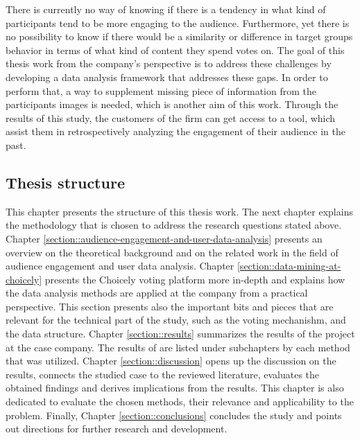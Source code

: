     There is currently no way of knowing if there is a tendency in what kind of participants tend to be more engaging to the audience. Furthermore, yet there is no possibility to know if there would be a similarity or difference in target groups behavior in terms of what kind of content they spend votes on. The goal of this thesis work from the company's perspective is to address these challenges by developing a data analysis framework that addresses these gaps. In order to perform that, a way to supplement missing piece of information from the participants images is needed, which is another aim of this work. Through the results of this study, the customers of the firm can get access to a tool, which assist them in retrospectively analyzing the engagement of their audience in the past.

\subsection{Thesis structure}
    This chapter presents the structure of this thesis work. The next chapter explains the methodology that is chosen to address the research questions stated above. Chapter \ref{section::audience-engagement-and-user-data-analysis} presents an overview on the theoretical background and on the related work in the field of audience engagement and user data analysis. Chapter \ref{section::data-mining-at-choicely} presents the Choicely voting platform more in-depth and explains how the data analysis methods are applied at the company from a practical perspective. This section presents also the important bits and pieces that are relevant for the technical part of the study, such as the voting mechanishm, and the data structure. Chapter \ref{section::results} summarizes the results of the project at the case company. The results of are listed under subchapters by each method that was utilized. Chapter \ref{section::discussion} opens up the discussion on the results, connects the studied case to the reviewed literature, evaluates the obtained findings and derives implications from the results. This chapter is also dedicated to evaluate the chosen methods, their relevance and applicability to the problem. Finally, Chapter \ref{section::conclusions} concludes the study and points out directions for further research and development. 